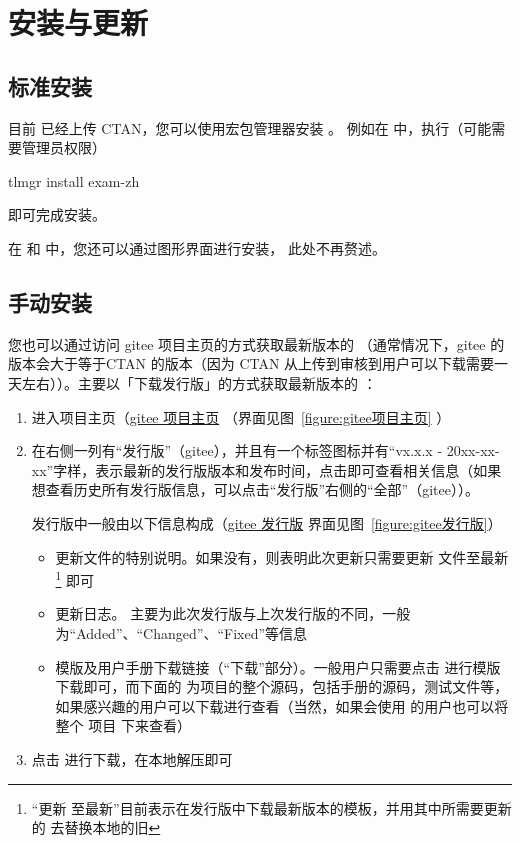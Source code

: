 
\section{安装与更新}


\subsection{标准安装}

目前  已经上传 CTAN，您可以使用宏包管理器安装 。
例如在 \TeXLive{} 中，执行（可能需要管理员权限）
\begin{shellcode}[morekeywords={tlmgr,install}]
  tlmgr install exam-zh
\end{shellcode}
即可完成安装。

在 \TeXLive{} 和 \MiKTeX{} 中，您还可以通过图形界面进行安装，
此处不再赘述。


\subsection{手动安装}

您也可以通过访问 gitee 项目主页的方式获取最新版本的 （通常情况下，gitee 的版本会大于等于CTAN 的版本（因为 CTAN 从上传到审核到用户可以下载需要一天左右））。主要以「下载发行版」的方式获取最新版本的 ：

\begin{enumerate}
  \item 进入项目主页（\href{https://gitee.com/zepinglee/exam-zh}{gitee 项目主页} （界面见图~\ref{figure:gitee项目主页} ）
  \item 在右侧一列有“发行版”（gitee），并且有一个标签图标并有“vx.x.x - 20xx-xx-xx”字样，表示最新的发行版版本和发布时间，点击即可查看相关信息（如果想查看历史所有发行版信息，可以点击“发行版”右侧的“全部”（gitee））。
  
    发行版中一般由以下信息构成（\href{https://gitee.com/zepinglee/exam-zh/releases}{gitee 发行版} 界面见图~\ref{figure:gitee发行版}）
      \begin{itemize}
        \item 更新文件的特别说明。如果没有，则表明此次更新只需要更新  文件至最新\footnote{“更新  至最新”目前表示在发行版中下载最新版本的模板，并用其中所需要更新的  去替换本地的旧 } 即可
        \item 更新日志。 主要为此次发行版与上次发行版的不同，一般为“Added”、“Changed”、“Fixed”等信息
        \item 模版及用户手册下载链接（“下载”部分）。一般用户只需要点击  进行模版下载即可，而下面的  为项目的整个源码，包括手册的源码，测试文件等，如果感兴趣的用户可以下载进行查看（当然，如果会使用  的用户也可以将整个  项目  下来查看）
      \end{itemize}
  \item 点击  进行下载，在本地解压即可
\end{enumerate}


